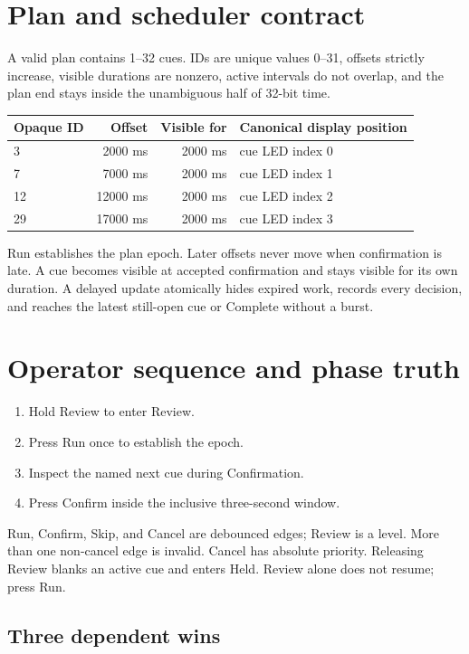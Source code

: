 \documentclass[11pt]{article}
\begin{document}
\section{Plan and scheduler contract}

A valid plan contains 1--32 cues. IDs are unique values 0--31, offsets strictly
increase, visible durations are nonzero, active intervals do not overlap, and
the plan end stays inside the unambiguous half of 32-bit time.

\begin{tabularx}{\linewidth}{@{}l r r X@{}}
\toprule
Opaque ID & Offset & Visible for & Canonical display position\\
\midrule
3 & 2000 ms & 2000 ms & cue LED index 0\\
7 & 7000 ms & 2000 ms & cue LED index 1\\
12 & 12000 ms & 2000 ms & cue LED index 2\\
29 & 17000 ms & 2000 ms & cue LED index 3\\
\bottomrule
\end{tabularx}

Run establishes the plan epoch. Later offsets never move when confirmation is
late. A cue becomes visible at accepted confirmation and stays visible for its
own duration. A delayed update atomically hides expired work, records every
decision, and reaches the latest still-open cue or Complete without a burst.

\section{Operator sequence and phase truth}

\begin{enumerate}
  \item Hold Review to enter Review.
  \item Press Run once to establish the epoch.
  \item Inspect the named next cue during Confirmation.
  \item Press Confirm inside the inclusive three-second window.
\end{enumerate}

Run, Confirm, Skip, and Cancel are debounced edges; Review is a level. More than
one non-cancel edge is invalid. Cancel has absolute priority. Releasing Review
blanks an active cue and enters Held. Review alone does not resume; press Run.

\subsection{Three dependent wins}
\end{document}
